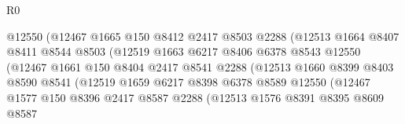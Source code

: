 \begin{lexlean}{R0}
\begin{coremodule}
                                  @12550
                                  (@12467
                                    @1665
                                    @150
                                    @8412
                                    @2417
                                    @8503
                                    @2288
                                    (@12513
                                      @1664
                                      @8407
                                      @8411
                                      @8544
                                      @8503
                                      (@12519
                                        @1663
                                        @6217
                                        @8406
                                        @6378
                                        @8543
                                        @12550
                                        (@12467
                                          @1661
                                          @150
                                          @8404
                                          @2417
                                          @8541
                                          @2288
                                          (@12513
                                            @1660
                                            @8399
                                            @8403
                                            @8590
                                            @8541
                                            (@12519
                                              @1659
                                              @6217
                                              @8398
                                              @6378
                                              @8589
                                              @12550
                                              (@12467
                                                @1577
                                                @150
                                                @8396
                                                @2417
                                                @8587
                                                @2288
                                                (@12513
                                                  @1576
                                                  @8391
                                                  @8395
                                                  @8609
                                                  @8587

\end{coremodule}
\end{lexlean}
